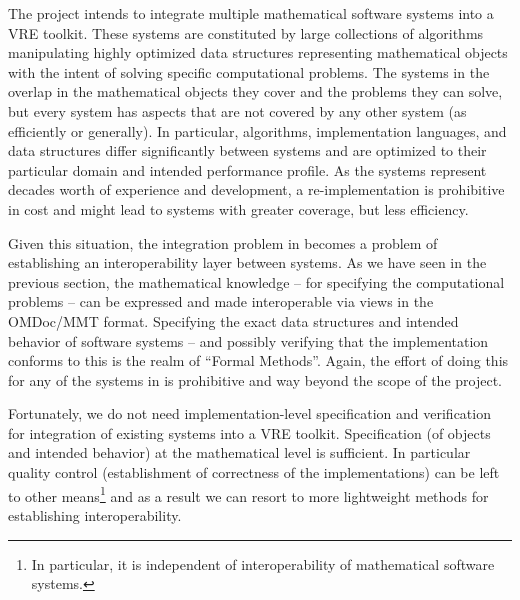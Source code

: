 The \pn project intends to integrate multiple mathematical software systems into a VRE
toolkit. These systems are constituted by large collections of algorithms manipulating
highly optimized data structures representing mathematical objects with the intent of
solving specific computational problems. The systems in the overlap in the mathematical
objects they cover and the problems they can solve, but every system has aspects that are
not covered by any other system (as efficiently or generally). In particular, algorithms,
implementation languages, and data structures differ significantly between systems and are
optimized to their particular domain and intended performance profile. As the systems
represent decades worth of experience and development, a re-implementation is prohibitive
in cost and might lead to systems with greater coverage, but less efficiency.

Given this situation, the integration problem in \pn becomes a problem of establishing an
interoperability layer between systems. As we have seen in the previous section, the
mathematical knowledge -- for specifying the computational problems -- can be expressed
and made interoperable via views in the OMDoc/MMT format. Specifying the exact data
structures and intended behavior of software systems -- and possibly verifying that the
implementation conforms to this is the realm of ``Formal Methods''. Again, the effort of
doing this for any of the systems in \pn is prohibitive and way beyond the scope of the
project.

Fortunately, we do not need implementation-level specification and verification for
integration of existing systems into a VRE toolkit. Specification (of objects and intended
behavior) at the mathematical level is sufficient. In particular quality control
(establishment of correctness of the implementations) can be left to other
means\footnote{In particular, it is independent of interoperability of mathematical
  software systems.} and as a result we can resort to more lightweight methods for
establishing interoperability. 

